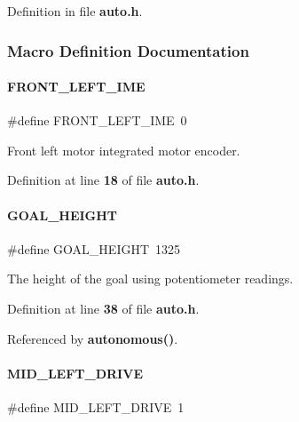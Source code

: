 Definition in file \textbf{ auto.\+h}.



\subsubsection{Macro Definition Documentation}
\mbox{\label{auto_8h_a7bc3203ebc61f8414788156a8616047c}} 
\paragraph{F\+R\+O\+N\+T\+\_\+\+L\+E\+F\+T\+\_\+\+I\+ME}
{\footnotesize\ttfamily \#define F\+R\+O\+N\+T\+\_\+\+L\+E\+F\+T\+\_\+\+I\+ME~0}



Front left motor integrated motor encoder. 



Definition at line \textbf{ 18} of file \textbf{ auto.\+h}.

\mbox{\label{auto_8h_a83cf08759ac4ffc3ea6e3b7f9c406b3c}} 
\paragraph{G\+O\+A\+L\+\_\+\+H\+E\+I\+G\+HT}
{\footnotesize\ttfamily \#define G\+O\+A\+L\+\_\+\+H\+E\+I\+G\+HT~1325}



The height of the goal using potentiometer readings. 



Definition at line \textbf{ 38} of file \textbf{ auto.\+h}.



Referenced by \textbf{ autonomous()}.

\mbox{\label{auto_8h_a811b1777cccc7f0e3abbec1874715f0a}} 
\paragraph{M\+I\+D\+\_\+\+L\+E\+F\+T\+\_\+\+D\+R\+I\+VE}
{\footnotesize\ttfamily \#define M\+I\+D\+\_\+\+L\+E\+F\+T\+\_\+\+D\+R\+I\+VE~1}



